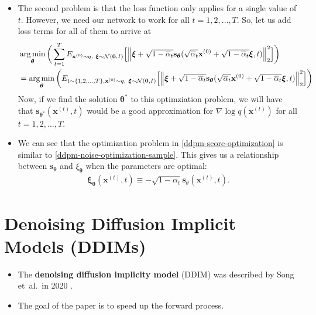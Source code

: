\documentclass[10pt]{article}
\newcommand{\ve}[1]{\mathbf{#1}}
\newcommand{\ves}[1]{\boldsymbol{#1}}
\newcommand{\etal}{{et~al.}}
\newcommand{\mcal}[1]{\mathcal{#1}}
\DeclareMathOperator*{\argmin}{arg\,min}
\begin{document}
\begin{itemize}
  \item The second problem is that the loss function only applies for a single value of $t$. However, we need our network to work for all $t = 1, 2, \dotsc, T$. So, let us add loss terms for all of them to arrive at
  \begin{align}
    &\argmin_{\ves{\theta}} \bigg( \sum_{t=1}^T E_{ \ve{x}^{(0)} \sim q,\ \ves{\xi} \sim \mcal{N}(\ve{0},I)} 
    \Big[ \Big\| \ves{\xi} + \sqrt{1 - \overline{\alpha}_t} \ve{s}_{\ves{\theta}}(\sqrt{\overline{\alpha}_t} \ve{x}^{(0)} + \sqrt{1 - \overline{\alpha}_t} \ves{\xi}, t) \Big\|^2_2 \Big] \bigg) \notag \\
    &= \argmin_{\ves{\theta}} \bigg( E_{ t \sim \{ 1, 2, \dotsc, T \}, \ve{x}^{(0)} \sim q,\ \ves{\xi} \sim \mcal{N}(\ve{0},I)} 
    \Big[ \Big\| \ves{\xi} + \sqrt{1 - \overline{\alpha}_t} \ve{s}_{\ves{\theta}}(\sqrt{\overline{\alpha}_t} \ve{x}^{(0)} + \sqrt{1 - \overline{\alpha}_t} \ves{\xi}, t) \Big\|^2_2 \Big] \bigg) \label{ddpm-score-optimization} 
  \end{align}
  Now, if we find the solution $\ve{\theta}^*$ to this optimziation problem, we will have that $\ve{s}_{\ves{\theta}^*}(\ve{x}^{(t)}, t)$ would be a good approximation for $\nabla \log q(\ve{x}^{(t)})$ for all $t = 1, 2, \dotsc, T$.

  \item We can see that the optimization problem in \eqref{ddpm-score-optimization} is similar to \eqref{ddpm-noise-optimization-sample}. This gives us a relationship between $\ve{s}_{\ves{\theta}}$ and $\xi_{\ves{\theta}}$ when the parameters are optimal:
  \begin{align} \label{noise-score-relationship}
    \ves{\xi}_{\ves{\theta}}(\ve{x}^{(t)}, t) \equiv -\sqrt{1 - \overline{\alpha}_t} \ve{s}_{\theta}(\ve{x}^{(t)}, t).
  \end{align}
\end{itemize}

\section{Denoising Diffusion Implicit Models (DDIMs)}

\begin{itemize}
  \item The {\bf denoising diffusion implicity model} (DDIM) was described by Song \etal\ in 2020 \cite{Song:2020}.
  
  \item The goal of the paper is to speed up the forward process.
\end{itemize}
\end{document}
